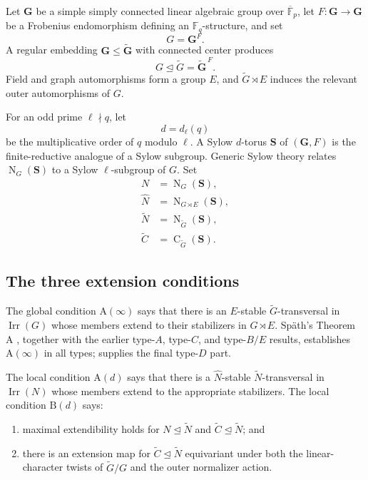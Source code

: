 \documentclass[11pt]{article}
\newcommand{\Irr}{\operatorname{Irr}}
\newcommand{\Norm}{\operatorname{N}}
\newcommand{\Cent}{\operatorname{C}}
\newcommand{\Ad}{\mathrm{A}(d)}
\newcommand{\Bd}{\mathrm{B}(d)}
\newcommand{\Ainf}{\mathrm{A}(\infty)}
\newcommand{\G}{\mathbf{G}}
\newcommand{\Sbf}{\mathbf{S}}
\begin{document}
Let \(\G\) be a simple simply connected linear algebraic group over
\(\overline{\mathbb F}_p\), let \(F:\G\to\G\) be a Frobenius
endomorphism defining an \(\mathbb F_q\)-structure, and set
\[
  G=\G^F.
\]
A regular embedding \(\G\leq\widetilde{\G}\) with connected center
produces
\[
  G\trianglelefteq\widetilde G=\widetilde{\G}^{\,F}.
\]
Field and graph automorphisms form a group \(E\), and
\(\widetilde G\rtimes E\) induces the relevant outer automorphisms of
\(G\).

For an odd prime \(\ell\nmid q\), let
\[
  d=d_\ell(q)
\]
be the multiplicative order of \(q\) modulo \(\ell\).  A Sylow
\(d\)-torus \(\Sbf\) of \((\G,F)\) is the finite-reductive analogue of
a Sylow subgroup.  Generic Sylow theory
\cite{BroueMalle1992,MalleTesterman2011} relates
\(\Norm_G(\Sbf)\) to a Sylow \(\ell\)-subgroup of \(G\).  Set
\[
\begin{aligned}
  N&=\Norm_G(\Sbf),\\
  \widehat N&=\Norm_{G\rtimes E}(\Sbf),\\
  \widetilde N&=\Norm_{\widetilde G}(\Sbf),\\
  \widetilde C&=\Cent_{\widetilde G}(\Sbf).
\end{aligned}
\]

\subsection{The three extension conditions}

The global condition \(\Ainf\) says that there is an \(E\)-stable
\(\widetilde G\)-transversal in \(\Irr(G)\) whose members extend to
their stabilizers in \(G\rtimes E\).  Sp{\"a}th's Theorem A
\cite{Spath2025II}, together with the earlier type-\(A\), type-\(C\), and
type-\(B/E\) results, establishes \(\Ainf\) in all types;
\cite{Spath2023I,Spath2025II} supplies the final type-\(D\) part.

The local condition \(\Ad\) says that there is a
\(\widehat N\)-stable \(\widetilde N\)-transversal in \(\Irr(N)\)
whose members extend to the appropriate stabilizers.  The local
condition \(\Bd\) says:

\begin{enumerate}
  \item maximal extendibility holds for
  \(N\trianglelefteq\widetilde N\) and
  \(\widetilde C\trianglelefteq\widetilde N\); and
  \item there is an extension map for
  \(\widetilde C\trianglelefteq\widetilde N\) equivariant under both
  the linear-character twists of \(\widetilde G/G\) and the outer
  normalizer action.
\end{enumerate}
\end{document}
